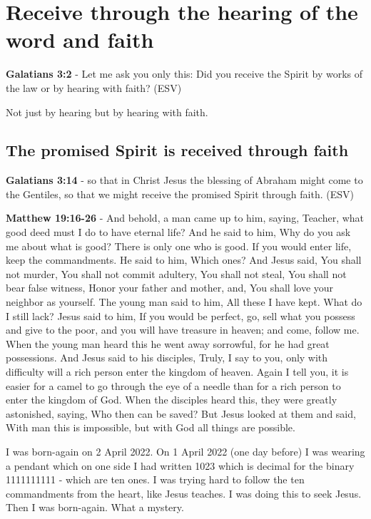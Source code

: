 \documentclass[11pt]{article}
\begin{document}
\section{Receive through the hearing of the word and faith}
\label{sec:org94de291}
\textbf{Galatians 3:2} - Let me ask you only this: Did you receive the Spirit by works of the law or by hearing with faith? (ESV)

Not just by hearing but by hearing with faith.

\subsection{The promised Spirit is received through faith}
\label{sec:org8ef15fe}
\textbf{Galatians 3:14} - so that in Christ Jesus the blessing of Abraham might come to the Gentiles, so that we might receive the promised Spirit through faith.  (ESV)

\textbf{Matthew 19:16-26} - And behold, a man came up to him, saying, Teacher, what good deed must I do to have eternal life?  And he said to him, Why do you ask me about what is good? There is only one who is good. If you would enter life, keep the commandments.  He said to him, Which ones? And Jesus said, You shall not murder, You shall not commit adultery, You shall not steal, You shall not bear false witness, Honor your father and mother, and, You shall love your neighbor as yourself.  The young man said to him, All these I have kept. What do I still lack?  Jesus said to him, If you would be perfect, go, sell what you possess and give to the poor, and you will have treasure in heaven; and come, follow me.  When the young man heard this he went away sorrowful, for he had great possessions.  And Jesus said to his disciples, Truly, I say to you, only with difficulty will a rich person enter the kingdom of heaven.  Again I tell you, it is easier for a camel to go through the eye of a needle than for a rich person to enter the kingdom of God.  When the disciples heard this, they were greatly astonished, saying, Who then can be saved?  But Jesus looked at them and said, With man this is impossible, but with God all things are possible.

I was born-again on 2 April 2022. On 1 April 2022 (one day before) I was wearing a pendant which on one side I had written 1023 which is decimal for the binary 1111111111 - which are ten ones. I was trying hard to follow the ten commandments from the heart, like Jesus teaches. I was doing this to seek Jesus. Then I was born-again. What a mystery.
\end{document}
